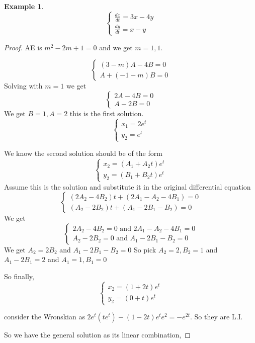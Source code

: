 \documentclass[oneside,11pt,pdftex,final]{book}%
\numberwithin{equation}{section}
\newtheorem{example}[theorem]{Example}
\numberwithin{section}{chapter}
\numberwithin{equation}{chapter}
\begin{document}
\begin{example}
	\[ \begin{cases}
		\frac{dx}{dt}=3x-4y\\
		\frac{dy}{dt}=x-y
	\end{cases} \]
\end{example}
\begin{proof}
	AE is $ m^2-2m+1=0 $ and we get $ m=1,1 $.
	
	\[ \begin{cases}
		(3-m)A-4B=0\\
		A+(-1-m)B=0
	\end{cases} \]
Solving with $ m=1 $ we get
\[ \begin{cases}
	2A-4B=0\\
	A-2B=0
\end{cases} \]
We get $ B=1,A=2 $ this is the first solution.
\[ \begin{cases}
	x_1=2e^{t}\\
	y_2=e^t
\end{cases} \]

We know the second solution should be of the form
\[ \begin{cases}
	x_2=(A_1+A_2t)e^{t}\\
	y_2=(B_1+B_2t)e^{t}
\end{cases} \]
Assume this is the solution and substitute it in the original differential equation
\[ \begin{cases}
	(2A_2-4B_2)t+(2A_1-A_2-4B_1)=0\\
	(A_2-2B_2)t+(A_1-2B_1-B_2)=0
\end{cases} \]
We get 
\[ \begin{cases}
	2A_2-4B_2=0 \text{ and } 2A_1-A_2-4B_1=0\\
	A_2-2B_2=0 \text{ and } A_1-2B_1-B_2=0
\end{cases} \]
We get $ A_2=2B_2 $ and $ A_1-2B_1-B_2=0 $
So pick $ A_2=2,B_2=1 $ and $ A_1-2B_1=2 $
and $ A_1=1,B_1=0 $

So finally,
\[ \begin{cases}
	x_2=(1+2t)e^{t}\\
	y_2=(0+t)e^t
\end{cases} \]

consider the Wronskian as $ 2e^t(te^t)-(1-2t)e^{t}e^2=-e^{2t} $. So they are L.I.

So we have the general solution as its linear combination,
\end{proof}
\end{document}
